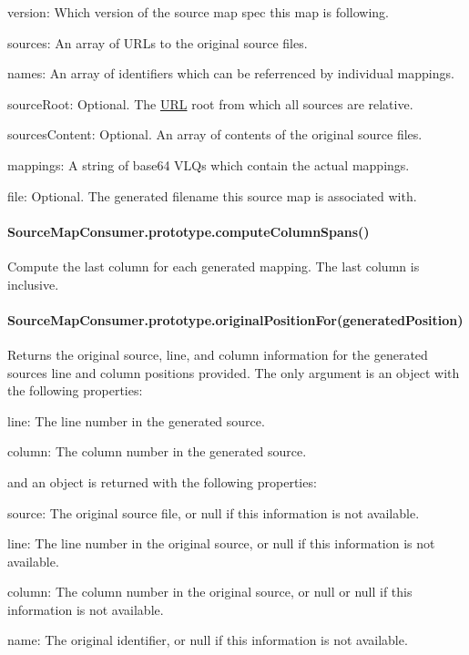 \begin{DoxyItemize}
\item {\ttfamily version}\+: Which version of the source map spec this map is following.
\item {\ttfamily sources}\+: An array of U\+R\+Ls to the original source files.
\item {\ttfamily names}\+: An array of identifiers which can be referrenced by individual mappings.
\item {\ttfamily source\+Root}\+: Optional. The \mbox{\hyperlink{namespace_u_r_l}{U\+RL}} root from which all sources are relative.
\item {\ttfamily sources\+Content}\+: Optional. An array of contents of the original source files.
\item {\ttfamily mappings}\+: A string of base64 V\+L\+Qs which contain the actual mappings.
\item {\ttfamily file}\+: Optional. The generated filename this source map is associated with.
\end{DoxyItemize}

\paragraph*{Source\+Map\+Consumer.\+prototype.\+compute\+Column\+Spans()}

Compute the last column for each generated mapping. The last column is inclusive.

\paragraph*{Source\+Map\+Consumer.\+prototype.\+original\+Position\+For(generated\+Position)}

Returns the original source, line, and column information for the generated source\textquotesingle{}s line and column positions provided. The only argument is an object with the following properties\+:


\begin{DoxyItemize}
\item {\ttfamily line}\+: The line number in the generated source.
\item {\ttfamily column}\+: The column number in the generated source.
\end{DoxyItemize}

and an object is returned with the following properties\+:


\begin{DoxyItemize}
\item {\ttfamily source}\+: The original source file, or null if this information is not available.
\item {\ttfamily line}\+: The line number in the original source, or null if this information is not available.
\item {\ttfamily column}\+: The column number in the original source, or null or null if this information is not available.
\item {\ttfamily name}\+: The original identifier, or null if this information is not available.
\end{DoxyItemize}

